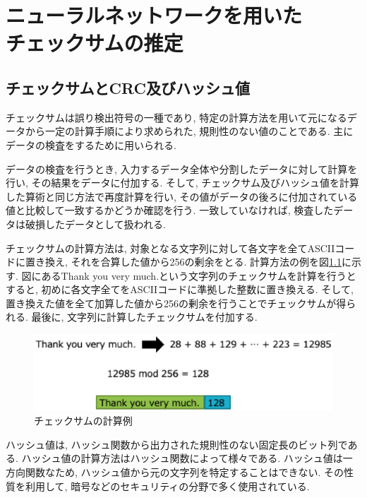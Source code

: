 \documentclass[11pt]{jbook}
\begin{document}
\chapter{ニューラルネットワークを用いた \\ チェックサムの推定}
\section{チェックサムとCRC及びハッシュ値}

チェックサムは誤り検出符号の一種であり, 特定の計算方法を用いて元になるデータから一定の計算手順により求められた, 規則性のない値のことである.
主にデータの検査をするために用いられる.

データの検査を行うとき, 入力するデータ全体や分割したデータに対して計算を行い, その結果をデータに付加する.
そして, チェックサム及びハッシュ値を計算した算術と同じ方法で再度計算を行い, その値がデータの後ろに付加されている値と比較して一致するかどうか確認を行う.
一致していなければ, 検査したデータは破損したデータとして扱われる.

チェックサムの計算方法は, 対象となる文字列に対して各文字を全てASCIIコードに置き換え, それを合算した値から256の剰余をとる.
計算方法の例を図\ref{cksum}に示す.
図にあるThank you very much.という文字列のチェックサムを計算を行うとすると, 初めに各文字全てをASCIIコードに準拠した整数に置き換える.
そして, 置き換えた値を全て加算した値から256の剰余を行うことでチェックサムが得られる.
最後に, 文字列に計算したチェックサムを付加する.


\begin{figure}[htbp]
\begin{center}
\includegraphics[width=130mm]{chsum.eps}
\caption{チェックサムの計算例}
\label{cksum}
\end{center}
\end{figure}

ハッシュ値は, ハッシュ関数から出力された規則性のない固定長のビット列である.
ハッシュ値の計算方法はハッシュ関数によって様々である.
ハッシュ値は一方向関数なため, ハッシュ値から元の文字列を特定することはできない.
その性質を利用して, 暗号などのセキュリティの分野で多く使用されている.
\end{document}
